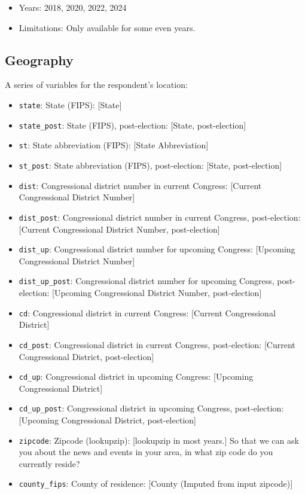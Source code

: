 \documentclass[10pt,article,oneside]{memoir}
\begin{document}
\begin{itemize}
\tightlist
\item
  Years: 2018, 2020, 2022, 2024
\item
  Limitations: Only available for some even years.
\end{itemize}

\subsection{Geography}\label{geography}

A series of variables for the respondent's location:

\begin{itemize}
\tightlist
\item
  \texttt{state}: State (FIPS): {[}State{]}
\item
  \texttt{state\_post}: State (FIPS), post-election: {[}State,
  post-election{]}
\item
  \texttt{st}: State abbreviation (FIPS): {[}State Abbreviation{]}
\item
  \texttt{st\_post}: State abbreviation (FIPS), post-election: {[}State,
  post-election{]}
\item
  \texttt{dist}: Congressional district number in current Congress:
  {[}Current Congressional District Number{]}
\item
  \texttt{dist\_post}: Congressional district number in current
  Congress, post-election: {[}Current Congressional District Number,
  post-election{]}
\item
  \texttt{dist\_up}: Congressional district number for upcoming
  Congress: {[}Upcoming Congressional District Number{]}
\item
  \texttt{dist\_up\_post}: Congressional district number for upcoming
  Congress, post-election: {[}Upcoming Congressional District Number,
  post-election{]}
\item
  \texttt{cd}: Congressional district in current Congress: {[}Current
  Congressional District{]}
\item
  \texttt{cd\_post}: Congressional district in current Congress,
  post-election: {[}Current Congressional District, post-election{]}
\item
  \texttt{cd\_up}: Congressional district in upcoming Congress:
  {[}Upcoming Congressional District{]}
\item
  \texttt{cd\_up\_post}: Congressional district in upcoming Congress,
  post-election: {[}Upcoming Congressional District, post-election{]}
\item
  \texttt{zipcode}: Zipcode (lookupzip): {[}lookupzip in most years.{]}
  So that we can ask you about the news and events in your area, in what
  zip code do you currently reside?
\item
  \texttt{county\_fips}: County of residence: {[}County (Imputed from
  input zipcode){]}
\end{itemize}
\end{document}
